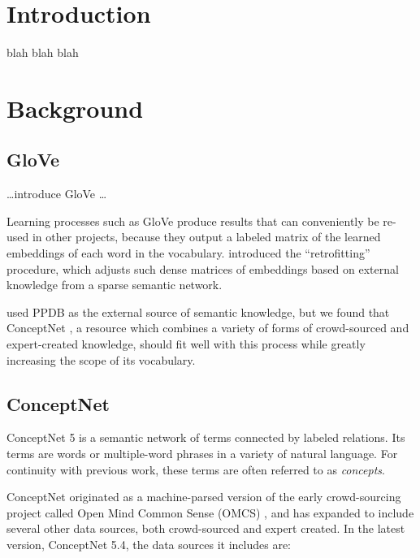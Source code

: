 \documentclass[letterpaper]{article}
\title{\thetitle}
\author{Robert Speer\\
    Luminoso Technologies, Inc.\\
    675 Massachusetts Ave.\\
    Cambridge, MA 02139\\
    \texttt{rspeer@luminoso.com}
\And
    Joshua Chin\\
    {\em academic address goes here}
\And
    Catherine Havasi\\
    Luminoso Technologies, Inc.\\
    675 Massachusetts Ave.\\
    Cambridge, MA 02139\\
    \texttt{havasi@luminoso.com}
}
\begin{document}
\maketitle
\begin{abstract}
We did stuff to GloVe and ConceptNet and got better stuff.
\end{abstract}

\section{Introduction}
blah blah blah

\section{Background}

\subsection{GloVe}
\ldots introduce GloVe \ldots %

Learning processes such as GloVe produce results that can conveniently be
re-used in other projects, because they output a labeled matrix of the learned
embeddings of each word in the vocabulary.
\citeauthor{faruqui2014retrofitting} 
introduced the ``retrofitting'' procedure, which adjusts such dense matrices of
embeddings based on external knowledge from a sparse semantic network.

\citeauthor{faruqui2014retrofitting} used PPDB \cite{ganitkevitch2013ppdb} as
the external source of semantic knowledge, but we found that ConceptNet
\cite{speer2012conceptnet}, a resource which combines a variety of forms of
crowd-sourced and expert-created knowledge, should fit well with this process
while greatly increasing the scope of its vocabulary.

\subsection{ConceptNet}
ConceptNet 5 \cite{speer2012conceptnet} is a semantic network of terms
connected by labeled relations. Its terms are words or multiple-word phrases
in a variety of natural language. For continuity with previous work,
these terms are often referred to as {\em concepts}.

ConceptNet originated as a machine-parsed version of the early crowd-sourcing
project called Open Mind Common Sense (OMCS) \cite{singh2002omcs}, and has expanded
to include several other data sources, both crowd-sourced and expert created.
In the latest version, ConceptNet 5.4, the data sources it includes are:
\end{document}
